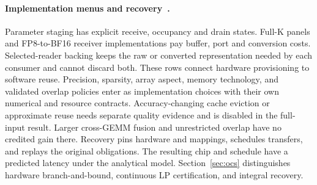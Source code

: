 \paragraph{Implementation menus and recovery~.}
Parameter staging has explicit receive, occupancy and drain states.
Full-K panels and FP8-to-BF16 receiver implementations pay buffer, port and conversion costs.
Selected-reader backing keeps the raw or converted representation needed by each consumer and cannot discard both.
These rows connect hardware provisioning to software reuse.
Precision, sparsity, array aspect, memory technology, and validated overlap policies enter as implementation choices with their own numerical and resource contracts.
Accuracy-changing cache eviction or approximate reuse needs separate quality evidence and is disabled in the full-input result.
Larger cross-GEMM fusion and unrestricted overlap have no credited gain there.
Recovery pins hardware and mappings, schedules transfers, and replays the original obligations.
The resulting chip and schedule have a predicted latency under the analytical model.
Section~\ref{sec:ocs} distinguishes hardware branch-and-bound, continuous LP certification, and integral recovery.

